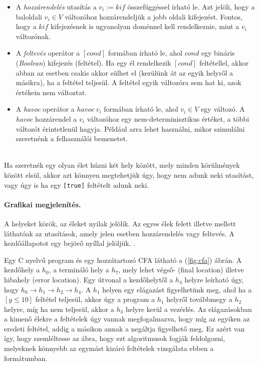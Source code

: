 \begin{itemize}
	\item A \emph{hozzárendelés} utasítás a $v_i := \mathit{kif}$ összefüggéssel írható le. Azt jelöli, hogy a baloldali $v_i \in V$ változóhoz hozzárendeljük a jobb oldali kifejezést. Fontos, hogy a $\mathit{kif}$ kifejezésnek is ugyanolyan doménnel kell rendelkeznie, mint a $v_i$ változónak.
	
	\item A \emph{feltevés} operátor a $[\mathit{cond}]$ formában írható le, ahol $\mathit{cond}$ egy bináris (\emph{Boolean}) kifejezés (feltétel). Ha egy él rendelkezik $\mathit{[cond]}$ feltétellel, akkor abban az esetben csakis akkor sülhet el (kerülünk át az egyik helyről a másikra), ha a feltétel teljesül. A feltétel egyik változóra sem hat ki, azok értékein nem változtat.
	
	\item A \emph{havoc} operátor a $\mathit{havoc}~v_i$ formában írható le, ahol $v_i \in V$ egy változó. A \emph{havoc} hozzárendel a $v_i$ változóhoz egy nem-determinisztikus értéket, a többi változót érintetlenül hagyja. Például arra lehet használni, mikor szimulálni szeretnénk a felhasználói bemenetet.
\end{itemize}
\ \\
Ha szeretnék egy olyan élet húzni két hely között, mely minden körülmények között elsül, akkor azt könnyen megtehetjük úgy, hogy nem adunk neki utasítást, vagy úgy is ha egy \texttt{[true]} feltételt adunk neki.

\paragraph{Grafikai megjelenítés.}
A helyeket körök, az éleket nyilak jelölik. Az egyes élek felett illetve mellett láthatóak az utasítások, amely jelen esetben hozzárendelés vagy feltevés. A kezdőállapotot egy bejövő nyíllal jelöljük. \cite{soft_ver_akos}.

\begin{example}
	Egy C nyelvű program és egy hozzátartozó CFA látható a (\ref{fig:cfa}) ábrán. A kezdőhely a $h_0$, a termináló hely a $h_7$, mely lehet végső- (final location) illetve hibahely (error location). Egy útvonal a kezdőhelytől a $h_4$ helyre leírható úgy, hogy $h_0 \rightarrow h_1 \rightarrow h_2 \rightarrow h_4$. A $h_1$ helyen egy elágazást figyelhetünk meg, ahol ha a $[y \leq 10]$ feltétel teljesül, akkor úgy a program a $h_1$ helyről továbbmegy a $h_2$ helyre, míg ha nem teljesül, akkor a $h_3$ helyre kerül a vezérlés. Az elágazásokban a kimenő élekre a feltételek úgy vannak megfogalmazva, hogy míg az egyiken az eredeti feltétel, addig a másikon annak a negáltja figyelhető meg. Ez azért van így, hogy szemléltesse az ábra, hogy ezt algoritmusok fogják feldolgozni, melyeknek könnyebb az egymást kizáró feltételek vizsgálata ebben a formátumban.
\end{example}

